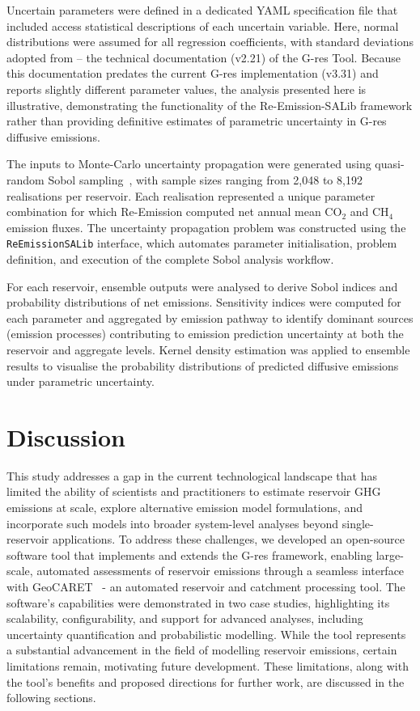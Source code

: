 \documentclass[review, authoryear, 1p]{elsarticle} %
\begin{document}
Uncertain parameters were defined in a dedicated YAML specification file that included access statistical descriptions of each uncertain variable. 
Here, normal distributions were assumed for all regression coefficients, with standard deviations adopted from \citet{Prairie2017b_old} -- the technical documentation (v2.21) of the G-res Tool. 
Because this documentation predates the current G-res implementation (v3.31) and reports slightly different parameter values, the analysis presented here is illustrative, demonstrating the functionality of the {Re-Emission}-{SALib} framework rather than providing definitive estimates of parametric uncertainty in G-res diffusive emissions.

The inputs to Monte-Carlo uncertainty propagation were generated using quasi-random Sobol sampling~\citep{Saltelli2002}, with sample sizes ranging from 2{,}048 to 8{,}192 realisations per reservoir. 
Each realisation represented a unique parameter combination for which {Re-Emission} computed net annual mean CO$_2$ and CH$_4$ emission fluxes. 
The uncertainty propagation problem was constructed using the \texttt{ReEmissionSALib} interface, which automates parameter initialisation, problem definition, and execution of the complete Sobol analysis workflow.

For each reservoir, ensemble outputs were analysed to derive Sobol indices and probability distributions of net emissions. 
Sensitivity indices were computed for each parameter and aggregated by emission pathway to identify dominant sources (emission processes) contributing to emission prediction uncertainty at both the reservoir and aggregate levels. 
Kernel density estimation was applied to ensemble results to visualise the probability distributions of predicted diffusive emissions under parametric uncertainty.


\section{Discussion}
\label{sec:discussion}

This study addresses a gap in the current technological landscape that has limited the ability of scientists and practitioners to estimate reservoir \ac{GHG} emissions at scale, explore alternative emission model formulations, and incorporate such models into broader system-level analyses beyond single-reservoir applications.
To address these challenges, we developed an open-source software tool that implements and extends the G-res framework, enabling large-scale, automated assessments of reservoir emissions through a seamless interface with GeoCARET~\cite{heettool} - an automated reservoir and catchment processing tool.
The software’s capabilities were demonstrated in two case studies, highlighting its scalability, configurability, and support for advanced analyses, including uncertainty quantification and probabilistic modelling.
While the tool represents a substantial advancement in the field of modelling reservoir emissions, certain limitations remain, motivating future development.
These limitations, along with the tool's benefits and proposed directions for further work, are discussed in the following sections.
\end{document}
